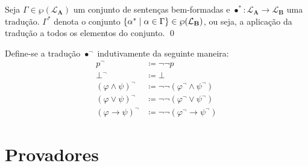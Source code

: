 \begin{notation}
    Seja $\Gamma\in\wp(\mathcal{L}_\mathbf{A})$ um conjunto de sentenças bem-formadas e $\bullet^*\mathrel{:}\mathcal{L}_\mathbf{A}\to\mathcal{L}_\mathbf{B}$ uma tradução. $\Gamma^*$ denota o conjunto $\left\{\alpha^*\mid\alpha\in\Gamma\right\}\in\wp(\mathcal{L}_\mathbf{B})$, ou seja, a aplicação da tradução a todos os elementos do conjunto.
    \qed{}
\end{notation}

\begin{definition}[$\bullet^\neg$] Define-se a tradução $\bullet^\neg$ indutivamente da seguinte maneira:
    \begin{align*}
        p^\neg                     & \coloneqq \neg\neg p                               \\
        \bot^\neg                  & \coloneqq \bot                                     \\
        {(\varphi \wedge \psi)}^\neg & \coloneqq \neg\neg (\varphi^\neg \wedge \psi^\neg) \\
        {(\varphi \vee \psi)}^\neg   & \coloneqq \neg\neg (\varphi^\neg \vee \psi^\neg)   \\
        {(\varphi \to \psi)}^\neg    & \coloneqq \neg\neg (\varphi^\neg \to \psi^\neg)
        \tag*{\qed} 
    \end{align*}
\end{definition}

\section{Provadores}
